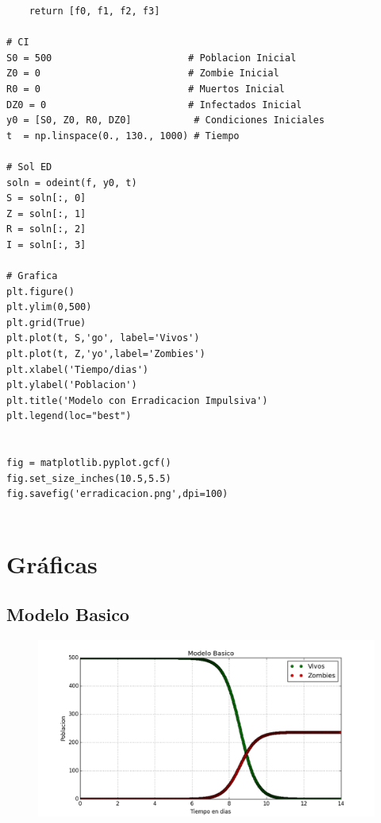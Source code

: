 \documentclass[12pt]{article}
\begin{document}
\begin{verbatim}
    return [f0, f1, f2, f3]

# CI
S0 = 500                        # Poblacion Inicial
Z0 = 0                          # Zombie Inicial
R0 = 0                          # Muertos Inicial
DZ0 = 0                         # Infectados Inicial
y0 = [S0, Z0, R0, DZ0]           # Condiciones Iniciales
t  = np.linspace(0., 130., 1000) # Tiempo

# Sol ED
soln = odeint(f, y0, t)
S = soln[:, 0]
Z = soln[:, 1]
R = soln[:, 2]
I = soln[:, 3]

# Grafica
plt.figure()
plt.ylim(0,500)
plt.grid(True)
plt.plot(t, S,'go', label='Vivos')
plt.plot(t, Z,'yo',label='Zombies')
plt.xlabel('Tiempo/dias')
plt.ylabel('Poblacion')
plt.title('Modelo con Erradicacion Impulsiva')
plt.legend(loc="best")


fig = matplotlib.pyplot.gcf()
fig.set_size_inches(10.5,5.5)
fig.savefig('erradicacion.png',dpi=100)


\end{verbatim}
\section{Gráficas}
\subsection{Modelo Basico}
\begin{figure}[H]
\includegraphics[scale=.6]{basico}
\end{figure}
\end{document}
